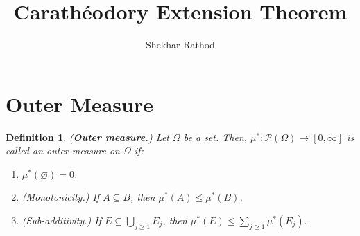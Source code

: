 \documentclass{article}
\title{Carathéodory Extension Theorem}
\author{Shekhar Rathod}
\date{}
\newcommand{\Po}{\mathscr{P}}
\theoremstyle{spaced}
\newtheorem{definition}[theorem]{Definition}
\begin{document}
\maketitle

\section{Outer Measure}

\begin{definition}
    (\textbf{Outer measure.}) Let $\Omega$ be a set. Then, $\mu^*: \Po(\Omega) \to [0, \infty]$ is called an \textit{outer measure} on $\Omega$ if:
    \begin{enumerate}
        \item $\mu^*(\varnothing) = 0$.
        \item (\textit{Monotonicity}.) If $A \subseteq B$, then $\mu^*(A) \leq \mu^*(B)$.
        \item  (\textit{Sub-additivity.}) If $E \subseteq \bigcup_{j \geq 1} E_j$, then $\mu^*(E) \leq \sum_{j \geq 1} \mu^{*}(E_j).$
    \end{enumerate}    
\end{definition}
\end{document}
